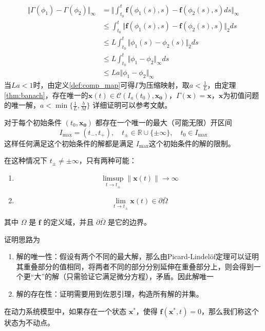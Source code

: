 \begin{pf}
\begin{equation*}
        \begin{aligned}
            \Vert\Gamma(\phi_1)-\Gamma(\phi_2)\Vert_{\infty} &=\Vert \int_{t_0}^t\mathbf{f}(\phi_1(s),s)-\mathbf{f}(\phi_2(s),s)ds\Vert_{\infty}\\
            &\leq\int_{t_0}^t\Vert\mathbf{f}(\phi_1(s),s)-\mathbf{f}(\phi_2(s),s)\Vert_2 ds\\
            &\leq L\int_{t_0}^t\Vert \phi_1(s)-\phi_2(s)\Vert_2 ds\\
            &\leq L\int_{t_0}^t\Vert \phi_1-\phi_2\Vert_{\infty} ds\\
            &\leq La\Vert \phi_1-\phi_2\Vert_{\infty}
        \end{aligned}
    \end{equation*}
    当$La<1$时，由定义\ref{def:comp_map}可得$\Gamma$为压缩映射，取$a<\frac{1}{L}$，由定理\ref{thm:banach}，存在唯一的$\mathbf{x}(t)\in \mathcal{C}(I_a(t_0),\mathbf{x_0})$，$\Gamma(\mathbf{x})=\mathbf{x}$，$\mathbf{x}$为初值问题的唯一解，$a<\min\{\frac{1}{L},\frac{b}{M}\}$
    详细证明可以参考文献\cite{murray2013existence}。
\end{pf}
\begin{rem}\label{rem:P-L}
    对于每个初始条件 $(t_0, \mathbf{x_0})$ 都存在一个唯一的最大（可能无限）开区间
$$I_{\text{max}} = (t_{-}, t_{+}), \quad t_{\pm} \in \mathbb{R} \cup \{\pm \infty\}, \quad t_0 \in I_{\text{max}}$$
这样任何满足这个初始条件的解都是满足 $I_{\text{max}}$这个初始条件的解的限制。

在这种情况下 $t_{\pm} \neq \pm \infty$，只有两种可能：
\begin{enumerate}
    \item $$\limsup_{t \to t_{\pm}} \|\mathbf{x}(t)\| \to \infty$$
    \item $$\lim_{t \to t_{\pm}} \mathbf{x}(t) \in \partial \bar{\Omega}$$
\end{enumerate}
其中 $\Omega$ 是 $\mathbf{f}$ 的定义域，并且 $\partial \bar{\Omega}$ 是它的边界。
\end{rem}
\begin{pf}
    证明思路为\begin{enumerate}
        \item 解的唯一性：假设有两个不同的最大解，那么由Picard-Lindelöf定理可以证明其重叠部分的值相同，将两者不同的部分分别延伸在重叠部分上，则会得到一个更“大”的解（只需验证它满足微分方程），矛盾。因此解唯一
        \item 解的存在性：证明需要用到佐恩引理，构造所有解的并集。
    \end{enumerate}
\end{pf}
\begin{defn}[不动点]
    在动力系统模型中，如果存在一个状态 $\mathbf{x}^*$，使得 $\mathbf{f}(\mathbf{x}^*, t) = 0$，那么我们称这个状态为不动点。
\end{defn}
